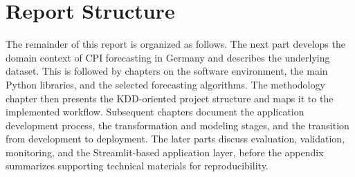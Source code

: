 \section{Report Structure}
The remainder of this report is organized as follows. The next part develops the domain context of CPI forecasting in Germany and describes the underlying dataset. This is followed by chapters on the software environment, the main Python libraries, and the selected forecasting algorithms. The methodology chapter then presents the KDD-oriented project structure and maps it to the implemented workflow. Subsequent chapters document the application development process, the transformation and modeling stages, and the transition from development to deployment. The later parts discuss evaluation, validation, monitoring, and the Streamlit-based application layer, before the appendix summarizes supporting technical materials for reproducibility. 
